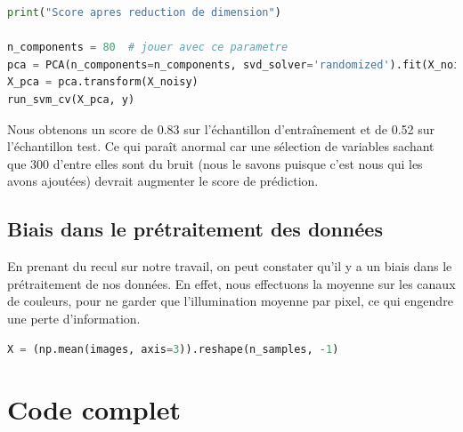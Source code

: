 \documentclass{book}
\begin{document}
\begin{lstlisting}[language=Python, caption=Prédiction avec l'utilisation de l'ACP pour réduire la dimension]
print("Score apres reduction de dimension")

n_components = 80  # jouer avec ce parametre
pca = PCA(n_components=n_components, svd_solver='randomized').fit(X_noisy)
X_pca = pca.transform(X_noisy)
run_svm_cv(X_pca, y)
\end{lstlisting}

Nous obtenons un score de 0.83 sur l'échantillon d'entraînement et de 0.52 sur l'échantillon test. Ce qui paraît anormal car une sélection de variables sachant que 300 d'entre elles sont du bruit (nous le savons puisque c'est nous qui les avons ajoutées) devrait augmenter le score de prédiction.

\section{Biais dans le prétraitement des données}

En prenant du recul sur notre travail, on peut constater qu'il y a un biais dans le prétraitement de nos données. En effet, nous effectuons la moyenne sur les canaux de couleurs, pour ne garder que l'illumination moyenne par pixel, ce qui engendre une perte d'information. 

\begin{lstlisting}[language=Python, caption=Hypothèse d'une commande source de perte d'information]
X = (np.mean(images, axis=3)).reshape(n_samples, -1)
\end{lstlisting}

\chapter{Code complet}
\end{document}
